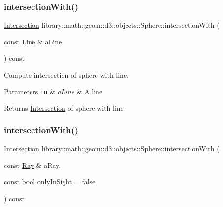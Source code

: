 \subsubsection{\texorpdfstring{intersection\+With()}{intersectionWith()}\hspace{0.1cm}{\footnotesize\ttfamily [1/4]}}
{\footnotesize\ttfamily \hyperlink{classlibrary_1_1math_1_1geom_1_1d3_1_1_intersection}{Intersection} library\+::math\+::geom\+::d3\+::objects\+::\+Sphere\+::intersection\+With (\begin{DoxyParamCaption}\item[{const \hyperlink{classlibrary_1_1math_1_1geom_1_1d3_1_1objects_1_1_line}{Line} \&}]{a\+Line }\end{DoxyParamCaption}) const}



Compute intersection of sphere with line. 


\begin{DoxyParams}[1]{Parameters}
\mbox{\tt in}  & {\em a\+Line} & A line \\
\hline
\end{DoxyParams}
\begin{DoxyReturn}{Returns}
\hyperlink{classlibrary_1_1math_1_1geom_1_1d3_1_1_intersection}{Intersection} of sphere with line 
\end{DoxyReturn}
\mbox{\label{classlibrary_1_1math_1_1geom_1_1d3_1_1objects_1_1_sphere_a2d142839c409faebccc36999d464e3bd}} 
\subsubsection{\texorpdfstring{intersection\+With()}{intersectionWith()}\hspace{0.1cm}{\footnotesize\ttfamily [2/4]}}
{\footnotesize\ttfamily \hyperlink{classlibrary_1_1math_1_1geom_1_1d3_1_1_intersection}{Intersection} library\+::math\+::geom\+::d3\+::objects\+::\+Sphere\+::intersection\+With (\begin{DoxyParamCaption}\item[{const \hyperlink{classlibrary_1_1math_1_1geom_1_1d3_1_1objects_1_1_ray}{Ray} \&}]{a\+Ray,  }\item[{const bool}]{only\+In\+Sight = {\ttfamily false} }\end{DoxyParamCaption}) const}



